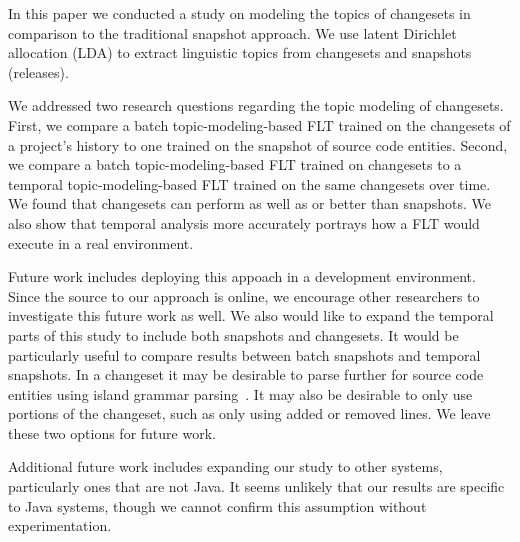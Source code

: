 
In this paper we conducted a study on modeling the topics of changesets in comparison to the traditional snapshot approach.
We use latent Dirichlet allocation (LDA) to extract linguistic topics from
changesets and snapshots (releases).

We addressed two research questions regarding the topic modeling of changesets.
First, we compare a batch topic-modeling-based FLT trained on the changesets
of a project's history to one trained on the snapshot of source code entities.
Second, we compare a batch topic-modeling-based FLT trained on changesets
to a temporal topic-modeling-based FLT trained on the same changesets over time.
We found that changesets can perform as well as or better than snapshots.
We also show that temporal analysis more accurately portrays how a FLT would execute in a real environment.


Future work includes deploying this appoach in a development environment.
Since the source to our approach is online, we encourage other researchers
to investigate this future work as well.
We also would like to expand the temporal parts of this study to include both snapshots and changesets.
It would be particularly useful to compare results between batch snapshots and temporal snapshots.
In a changeset it may be desirable to parse further for source code entities using island grammar parsing~\cite{Moonen:2001}.
It may also be desirable to only use portions of the changeset, such as only using added or removed lines.
We leave these two options for future work.

Additional future work includes expanding our study to other systems,
particularly ones that are not Java.
It seems unlikely that our results are specific to Java systems,
though we cannot confirm this assumption without experimentation.

